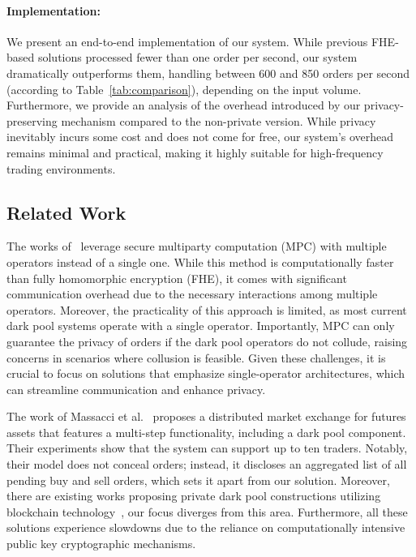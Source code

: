 \paragraph{Implementation:} We present an end-to-end implementation of our system. While previous FHE-based solutions processed fewer than one order per second, our system dramatically outperforms them, handling between 600 and 850 orders per second (according to Table~\ref{tab:comparison}), depending on the input volume. Furthermore, we provide an analysis of the overhead introduced by our privacy-preserving mechanism compared to the non-private version. While privacy inevitably incurs some cost and does not come for free, our system's overhead remains minimal and practical, making it highly suitable for high-frequency trading environments.

\subsection{Related Work}

The works of~\cite{CartlidgeSA19,CartlidgeSA21,MazloomDPB23} leverage secure multiparty computation (MPC) with multiple operators instead of a single one. While this method is computationally faster than fully homomorphic encryption (FHE), it comes with significant communication overhead due to the necessary interactions among multiple operators. Moreover, the practicality of this approach is limited, as most current dark pool systems operate with a single operator. Importantly, MPC can only guarantee the privacy of orders if the dark pool operators do not collude, raising concerns in scenarios where collusion is feasible. Given these challenges, it is crucial to focus on solutions that emphasize single-operator architectures, which can streamline communication and enhance privacy.

The work of Massacci et al.~\cite{massacci2018futuresmex} proposes a distributed market exchange for futures assets that features a multi-step functionality, including a dark pool component. Their experiments show that the system can support up to ten traders. Notably, their model does not conceal orders; instead, it discloses an aggregated list of all pending buy and sell orders, which sets it apart from our solution. Moreover, there are existing works proposing private dark pool constructions utilizing blockchain technology~\cite{bag2019seal,galal2021publicly,ngo2021practical}, our focus diverges from this area. Furthermore, all these solutions experience slowdowns due to the reliance on computationally intensive public key cryptographic mechanisms.


